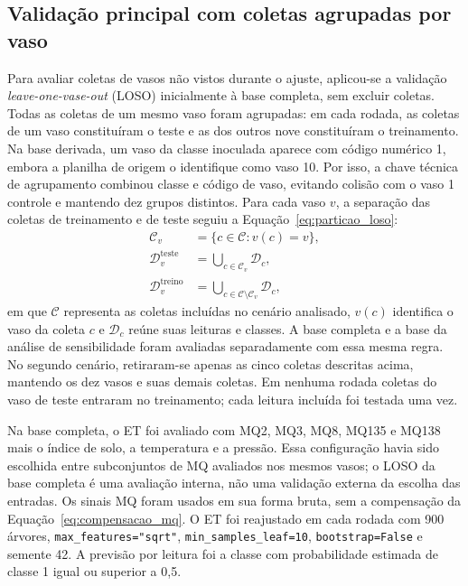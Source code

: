 \subsection{Validação principal com coletas agrupadas por vaso}
\label{subsec:loso_complementar}

Para avaliar coletas de vasos não vistos durante o ajuste, aplicou-se a
validação \textit{leave-one-vase-out} (LOSO) inicialmente à base completa,
sem excluir coletas. Todas as coletas de um mesmo vaso foram agrupadas:
em cada rodada, as coletas de um vaso constituíram o teste e as dos outros
nove constituíram o treinamento. Na base derivada, um vaso da classe
inoculada aparece com código numérico 1, embora a planilha de origem o
identifique como vaso 10. Por isso, a chave técnica de agrupamento combinou
classe e código de vaso, evitando colisão com o vaso 1 controle e mantendo
dez grupos distintos. Para cada vaso $v$, a separação das coletas de
treinamento e de teste seguiu a
Equação~\eqref{eq:particao_loso}:
\begin{equation}
    \begin{aligned}
        \mathcal{C}_v&=\{c\in\mathcal{C}:v(c)=v\},\\
        \mathcal{D}^{\mathrm{teste}}_v
        &=\bigcup_{c\in\mathcal{C}_v}\mathcal{D}_c,\\
        \mathcal{D}^{\mathrm{treino}}_v
        &=\bigcup_{c\in\mathcal{C}\setminus\mathcal{C}_v}\mathcal{D}_c,
    \end{aligned}
    \label{eq:particao_loso}
\end{equation}
em que $\mathcal{C}$ representa as coletas incluídas no cenário analisado,
$v(c)$ identifica o vaso da coleta $c$ e $\mathcal{D}_c$ reúne suas
leituras e classes. A base completa e a base da análise de sensibilidade
foram avaliadas separadamente com essa mesma regra. No segundo cenário,
retiraram-se apenas as cinco coletas descritas acima, mantendo os dez
vasos e suas demais coletas. Em nenhuma rodada coletas do vaso de teste
entraram no treinamento; cada leitura incluída foi testada uma vez.

Na base completa, o ET foi avaliado com MQ2, MQ3, MQ8, MQ135 e MQ138 mais
o índice de solo, a temperatura e a pressão. Essa configuração havia sido
escolhida entre subconjuntos de MQ avaliados nos mesmos vasos; o LOSO da
base completa é uma avaliação interna, não uma validação externa da
escolha das entradas. Os sinais MQ foram usados em sua forma bruta, sem
a compensação da Equação~\eqref{eq:compensacao_mq}. O ET foi reajustado em
cada rodada com 900 árvores,
\texttt{max\_features="sqrt"}, \texttt{min\_samples\_leaf=10},
\texttt{bootstrap=False} e semente 42. A previsão por leitura foi a classe
com probabilidade estimada de classe 1 igual ou superior a 0,5.

